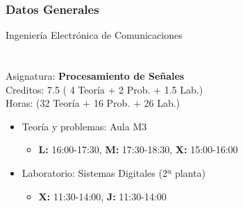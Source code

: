 \begin{frame}\frametitle{Datos Generales}
  \vspace{-0.2cm}
  \hspace{1.7cm} Ingeniería Electrónica de Comunicaciones \\
  \hspace{2.9cm}{Facultad de CC. Físicas, UCM} \\
  \hspace{3.0cm}{Curso Académico 2025-2026} \\
  \vspace{0.3cm}
  Asignatura:  \hspace{1cm}  \textbf{Procesamiento de Señales}\\
  \vspace{0.3cm}
  Creditos: \hspace{1.4cm}  7.5 \hspace{0.3cm}   (  \hspace{0.1cm}4 Teoría +  \hspace{0.1cm} 2 Prob. + 1.5 Lab.) \\
  Horas: \hspace{2.85cm}  (32 Teoría + 16 Prob. + \hspace{0.01cm} 26  Lab.) \\
  \vspace{0.2cm}
  
  \begin{itemize}
    \item \alert{Teoría y problemas: Aula M3}
    \begin{itemize}
      \item \textbf{L:} 16:00-17:30, \textbf{M:} 17:30-18:30, \textbf{X:} 15:00-16:00
    \end{itemize}

    \item \alert{Laboratorio: Sistemas Digitales (2ª planta)}
    \begin{itemize}
      \item \textbf{X:} 11:30-14:00, \textbf{J:} 11:30-14:00
    \end{itemize}


\end{itemize}
\end{frame}
